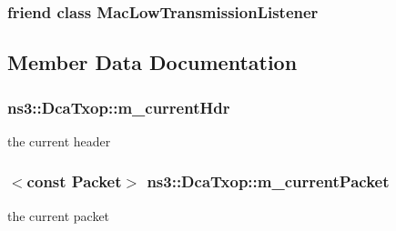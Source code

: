 \subsubsection[{\texorpdfstring{Mac\+Low\+Transmission\+Listener}{MacLowTransmissionListener}}]{\setlength{\rightskip}{0pt plus 5cm}friend class Mac\+Low\+Transmission\+Listener\hspace{0.3cm}{\ttfamily [friend]}}\hypertarget{classns3_1_1DcaTxop_acb0a74bf9ad91e525744779eda328365}{}\label{classns3_1_1DcaTxop_acb0a74bf9ad91e525744779eda328365}


\subsection{Member Data Documentation}
\subsubsection[{\texorpdfstring{m\+\_\+current\+Hdr}{m_currentHdr}}]{ ns3\+::\+Dca\+Txop\+::m\+\_\+current\+Hdr\hspace{0.3cm}{\ttfamily [protected]}}\hypertarget{classns3_1_1DcaTxop_ae965eb2f4d504e00526e751cd1dab3a6}{}\label{classns3_1_1DcaTxop_ae965eb2f4d504e00526e751cd1dab3a6}


the current header 

\subsubsection[{\texorpdfstring{m\+\_\+current\+Packet}{m_currentPacket}}]{$<$const {\bf Packet}$>$ ns3\+::\+Dca\+Txop\+::m\+\_\+current\+Packet\hspace{0.3cm}{\ttfamily [protected]}}\hypertarget{classns3_1_1DcaTxop_a3c454c21337aac0944f86caad8b7a719}{}\label{classns3_1_1DcaTxop_a3c454c21337aac0944f86caad8b7a719}


the current packet 

